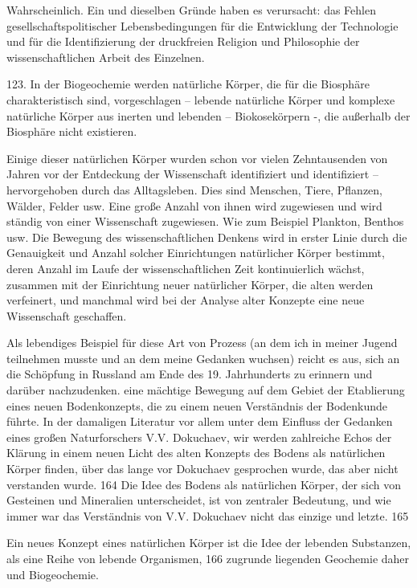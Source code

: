 \documentclass[11pt,a4paper]{book}
\begin{document}
Wahrscheinlich. Ein und dieselben Gründe haben es verursacht: das Fehlen gesellschaftspolitischer Lebensbedingungen für die Entwicklung der Technologie und für die Identifizierung der druckfreien Religion und Philosophie der wissenschaftlichen Arbeit des Einzelnen.



123. In der Biogeochemie werden natürliche Körper, die für die Biosphäre charakteristisch sind, vorgeschlagen -- lebende natürliche Körper und komplexe natürliche Körper aus inerten und lebenden -- Biokosekörpern -, die außerhalb der Biosphäre nicht existieren.



Einige dieser natürlichen Körper wurden schon vor vielen Zehntausenden von Jahren vor der Entdeckung der Wissenschaft identifiziert und identifiziert -- hervorgehoben durch das Alltagsleben. Dies sind Menschen, Tiere, Pflanzen, Wälder, Felder usw. Eine große Anzahl von ihnen wird zugewiesen und wird ständig von einer Wissenschaft zugewiesen. Wie zum Beispiel Plankton, Benthos usw. Die Bewegung des wissenschaftlichen Denkens wird in erster Linie durch die Genauigkeit und Anzahl solcher Einrichtungen natürlicher Körper bestimmt, deren Anzahl im Laufe der wissenschaftlichen Zeit kontinuierlich wächst, zusammen mit der Einrichtung neuer natürlicher Körper, die alten werden verfeinert, und manchmal wird bei der Analyse alter Konzepte eine neue Wissenschaft geschaffen.



Als lebendiges Beispiel für diese Art von Prozess (an dem ich in meiner Jugend teilnehmen musste und an dem meine Gedanken wuchsen) reicht es aus, sich an die Schöpfung in Russland am Ende des 19. Jahrhunderts zu erinnern und darüber nachzudenken. eine mächtige Bewegung auf dem Gebiet der Etablierung eines neuen Bodenkonzepts, die zu einem neuen Verständnis der Bodenkunde führte. In der damaligen Literatur vor allem unter dem Einfluss der Gedanken eines großen Naturforschers V.V. Dokuchaev, wir werden zahlreiche Echos der Klärung in einem neuen Licht des alten Konzepts des Bodens als natürlichen Körper finden, über das lange vor Dokuchaev gesprochen wurde, das aber nicht verstanden wurde. 164 Die Idee des Bodens als natürlichen Körper, der sich von Gesteinen und Mineralien unterscheidet, ist von zentraler Bedeutung, und wie immer war das Verständnis von V.V. Dokuchaev nicht das einzige und letzte. 165



Ein neues Konzept eines natürlichen Körper ist die Idee der lebenden Substanzen, als eine Reihe von lebende Organismen, 166 zugrunde liegenden Geochemie daher und Biogeochemie.
\end{document}
